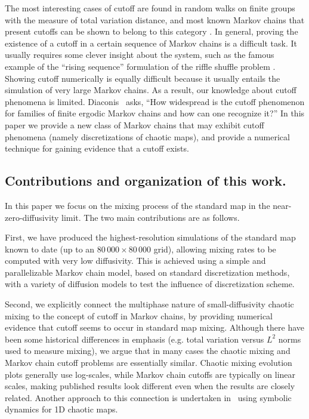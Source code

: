 \documentclass{aims}
\theoremstyle{definition}
\begin{document}
The most interesting cases of cutoff are found in random walks on
finite groups with the measure of total variation distance, and most
known Markov chains that present cutoffs can be shown to belong to
this category \cite{LSaloff-Costt2004}. In general, proving the
existence of a cutoff in a certain sequence of Markov chains is a
difficult task. It usually requires some clever insight about the
system, such as the famous example of the ``rising sequence''
formulation of the riffle shuffle problem \cite{Diaconis1992}. Showing
cutoff numerically is equally difficult because it usually entails the
simulation of very large Markov chains. As a result, our knowledge
about cutoff phenomena is limited. Diaconis~\cite{Diaconis1996,
  Diaconis2005} asks, ``How widespread is the cutoff phenomenon for
families of finite ergodic Markov chains and how can one recognize
it?'' In this paper we provide a new class of Markov chains that may
exhibit cutoff phenomena (namely discretizations of chaotic maps), and
provide a numerical technique for gaining evidence that a cutoff
exists.

\subsection{Contributions and organization of this work.}
In this paper we focus on the mixing process of the standard map in
the near-zero-diffusivity limit. The two main contributions are as
follows.

First, we have produced the highest-resolution simulations of the
standard map known to date (up to an $80\,000 \times 80\,000$ grid),
allowing mixing rates to be computed with very low diffusivity. This
is achieved using a simple and parallelizable Markov chain model,
based on standard discretization methods, with a variety of diffusion
models to test the influence of discretization scheme.

Second, we explicitly connect the multiphase nature of small-diffusivity
chaotic mixing to the concept of cutoff in Markov chains, by providing
numerical evidence that cutoff seems to occur in standard map
mixing. Although there have been some historical differences in
emphasis (e.g. total variation versus $L^2$ norms used to measure
mixing), we argue that in many cases the chaotic mixing and Markov
chain cutoff problems are essentially similar. Chaotic mixing
evolution plots generally use log-scales, while Markov chain cutoffs
are typically on linear scales, making published results look
different even when the results are closely related. Another approach
to this connection is undertaken in~\cite{symdyn} using symbolic
dynamics for 1D chaotic maps.
\end{document}
